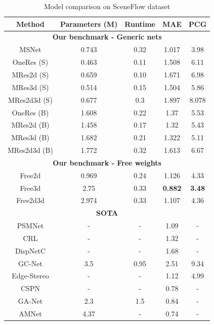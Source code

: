 \documentclass[10pt]{article}
\begin{document}
\begin{table}[]
    \centering
    \begin{tabular}{ c|c|c|c|c }
    Method & Parameters (M) & Runtime & MAE & PCG \\
    
    \hline
    \multicolumn{5}{c}{ \textbf{Our benchmark - Generic nets} } \\
    \hline
    MSNet & 0.743 & 0.32 & 1.017 & 3.98 \\
    \hline
    OneRes (S) & 0.463 & 0.11 & 1.508 & 6.11 \\
    MRes2d (S) & 0.659 & 0.10 & 1.671 & 6.98 \\
    MRes3d (S) & 0.514 & 0.15 & 1.504 & 5.86 \\
    MRes2d3d (S) & 0.677 & 0.3 & 1.897 & 8.078 \\
    \hline
    OneRes (B) & 1.608 & 0.22 & 1.37 & 5.53 \\
    MRes2d (B) & 1.458 & 0.17 & 1.32 & 5.43 \\
    MRes3d (B) & 1.682 & 0.21 & 1.322 & 5.11 \\
    MRes2d3d (B) & 1.772 & 0.32 & 1.613 & 6.67 \\
    \hline
    \multicolumn{5}{c}{ \textbf{Our benchmark - Free weights} } \\
    \hline
    Free2d & 0.969 & 0.24 & 1.126 & 4.33 \\
    Free3d & 2.75 & 0.33 & \textbf{0.882} & \textbf{3.48} \\
    Free2d3d & 2.974 & 0.33 & 1.107 & 4.36 \\
    \hline
    \multicolumn{5}{c}{ \textbf{SOTA} } \\
    \hline
    PSMNet\cite{Chang2018PyramidNetwork} & - & - & 1.09 & - \\
    CRL\cite{Pang2018CascadeMatching} & - & - & 1.32 & - \\
    DispNetC\cite{Mayer2016ALD} & - & - & 1.68 & - \\
    GC-Net\cite{Kendall2017End-to-EndRegression} & 3.5 & 0.95 & 2.51 & 9.34 \\
    Edge-Stereo\cite{SongEdgeStereoResidual} & - & - & 1.12 & 4.99 \\
    CSPN\cite{cheng2018learning} & - & - & 0.78 & - \\
    GA-Net\cite{zhang2019ga} & 2.3 & 1.5 & 0.84 & - \\
    AMNet\cite{du2019amnet} & 4.37 & - & 0.74 & - \\
    
    \hline
    \end{tabular}
    \caption{Model comparison on SceneFlow dataset}
    \label{tab:results}
\end{table}
\end{document}
